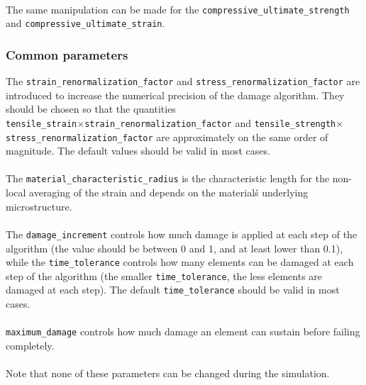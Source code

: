 \documentclass[10pt]{article}
\begin{document}
\paragraph{}The same manipulation can be made for the \verb+compressive_ultimate_strength+ and \verb+compressive_ultimate_strain+.

\subsubsection{Common parameters}

The \verb+strain_renormalization_factor+ and \verb+stress_renormalization_factor+ are introduced to increase the numerical precision of the damage algorithm. They should be chosen so that the quantities \\ \verb+tensile_strain+$\times$\verb+strain_renormalization_factor+ and \verb+tensile_strength+$\times$\verb+stress_renormalization_factor+ are approximately on the same order of magnitude. The default values should be valid in most cases.

\paragraph{} The \verb+material_characteristic_radius+ is the characteristic length for the non-local averaging of the strain and depends on the materialś underlying microstructure.

\paragraph{} The \verb+damage_increment+ controls how much damage is applied at each step of the algorithm (the value should be between 0 and 1, and at least lower than 0.1), while the \verb+time_tolerance+ controls how many elements can be damaged at each step of the algorithm (the smaller \verb+time_tolerance+, the less elements are damaged at each step). The default \verb+time_tolerance+ should be valid in most cases.

\paragraph{}\verb+maximum_damage+ controls how much damage an element can sustain before failing completely. 

\paragraph{}Note that none of these parameters can be changed during the simulation.
\end{document}
